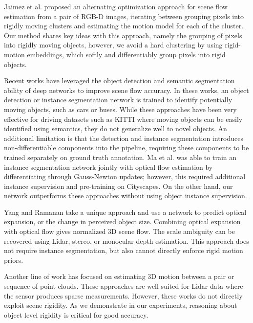 \documentclass[final]{cvpr}
\begin{document}
Jaimez et al.\cite{jaimez2015motion} proposed an alternating optimization approach for scene flow estimation from a pair of RGB-D images, iterating between grouping pixels into rigidly moving clusters and estimating the motion model for each of the cluster. Our method shares key ideas with this approach, namely the grouping of pixels into rigidly moving objects, however, we avoid a hard clustering by using rigid-motion embeddings, which softly and differentiably group pixels into rigid objects.

Recent works have leveraged the object detection and semantic segmentation ability of deep networks to improve scene flow accuracy\cite{ma2019deep,cao2019learning,ren2017cascaded,behl2017bounding,gordon2019depth}. In these works, an object detection or instance segmentation network is trained to identify potentially moving objects, such as cars or buses. While these approaches have been very effective for driving datasets such as KITTI where moving objects can be easily identified using semantics, they do not generalize well to novel objects. An additional limitation is that the detection and instance segmentation introduces non-differentiable components into the pipeline, requiring these components to be trained separately on ground truth annotation. Ma et al. \cite{ma2019deep} was able to train an instance segmentation network jointly with optical flow estimation by differentiating through Gauss-Newton updates; however, this required additional instance supervision and pre-training on Cityscapes\cite{cordts2016cityscapes}. On the other hand, our network outperforms these approaches without using object instance supervision.

Yang and Ramanan\cite{yang2020upgrading} take a unique approach and use a network to predict optical expansion, or the change in perceived object size. Combining optical expansion with optical flow gives normalized 3D scene flow. The scale ambiguity can be recovered using Lidar, stereo, or monocular depth estimation. This approach does not require instance segmentation, but also cannot directly enforce rigid motion priors.

Another line of work has focused on estimating 3D motion between a pair \cite{liu2019flownet3d,wang2020flownet3d++,gu2019hplflownet} or sequence\cite{liu2019meteornet,fan2019pointrnn} of point clouds. These approaches are well suited for Lidar data where the sensor produces sparse measurements. However, these works do not directly exploit scene rigidity. As we demonstrate in our experiments, reasoning about object level rigidity is critical for good accuracy. 
\end{document}
